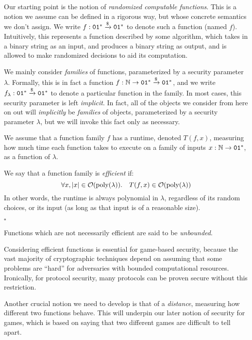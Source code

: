 Our starting point is the notion of \emph{randomized computable functions}.
This is a notion we assume can be defined in a rigorous way, but whose
concrete semantics we don't assign.
We write $f : \texttt{01}^* \xrightarrow{\$} \texttt{01}^*$ to denote such a function (named $f$).
Intuitively, this represents a function described by some algorithm,
which takes in a binary string as an input, and produces a binary string
as output, and is allowed to make randomized decisions to aid its computation.

We mainly consider \emph{families} of functions,
parameterized by a security parameter $\lambda$.
Formally, this is in fact a function $f : \mathbb{N} \to \texttt{01}^* \xrightarrow{\$} \texttt{01}^*$,
and we write $f_{\lambda} : \texttt{01}^* \xrightarrow{\$} \texttt{01}^*$ to denote a particular
function in the family.
In most cases, this security parameter is left \emph{implicit}.
In fact, all of the objects we consider from here on out will \emph{implicitly}
be \emph{families} of objects, parameterized by a security parameter $\lambda$,
but we will invoke this fact only as necessary.

\begin{definition}
    We assume that a function family $f$ has a runtime, denoted $T(f, x)$,
    measuring how much time each function takes to execute on a family of inputs $x : \mathbb{N} \to \texttt{01}^*$,
    as a function of $\lambda$.

    We say that a function family is \emph{efficient} if:
    $$
    \forall x, |x| \in \mathcal{O}(\text{poly}(\lambda)).\quad T(f, x) \in \mathcal{O}(\text{poly}(\lambda))
    $$
    In other words, the runtime is always polynomial in $\lambda$, regardless
    of its random choices, or its input (as long as that input is of a reasonable size).

    $\square$
\end{definition}

Functions which are not necessarily efficient are said to be \emph{unbounded}.

Considering efficient functions is essential for game-based security, because the vast majority
of cryptographic techniques depend on assuming that some problems are ``hard''
for adversaries with bounded computational resources.
Ironically, for protocol security, many protocols can be proven secure
without this restriction.

Another crucial notion we need to develop is that of a \emph{distance},
measuring how different two functions behave.
This will underpin our later notion of security for games,
which is based on saying that two different games are difficult
to tell apart.

